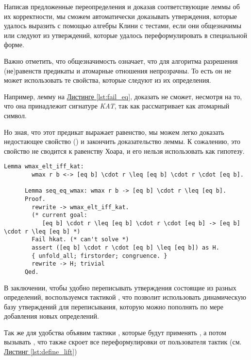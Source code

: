 \documentclass[times
              ,specification
              ,annotation
              ]{itmo-student-thesis}
\begin{document}
      Написав предложенные переопределения и доказав соответствующие леммы об их корректности, мы сможем
      автоматически доказывать утверждения, которые удалось выразить с помощью
      алгебры Клини с тестами, если они общезначимы или следуют из утверждений, которые удалось
      переформулировать в специальной форме.

      Важно отметить, что общезначимость означает, что для алгоритма разрешения (не)равенств предикаты
      и атомарные отношения непрозрачны. То есть он не может использовать те свойства, которые следуют
      из их определения.

      Например, лемму  на \hyperref[lst:fail_eq]{Листинге \ref{lst:fail_eq}},
       доказать не сможет, несмотря на то, что она принадлежит сигнатуре \textit{KAT}, так
      как рассматривает  как атомарный символ.

      Но зная, что этот предикат  выражает равенство, мы можем легко доказать
      недостающее свойство ()
      и закончить доказательство леммы. К сожалению, это свойство не сводится к равенству Хоара, и его нельзя использовать как гипотезу.
      \begin{lstlisting}[float=!h, gobble=6,
        caption={Пример невозможного использования hkat из-за нехватки гипотезы о внутреннем устройстве
        предиката}, label={lst:fail_eq}]
      Lemma wmax_elt_iff_kat:
        wmax r b <-> [eq b] \cdot r \leq [eq b] \cdot r \cdot [eq b].

      Lemma seq_eq_wmax: wmax r b -> [eq b] \cdot r \leq [eq b].
      Proof.
        rewrite -> wmax_elt_iff_kat.
        (* current goal:
           [eq b] \cdot r \leq [eq b] \cdot r \cdot [eq b] -> [eq b] \cdot r \leq [eq b] *)
        Fail hkat. (* can't solve *)
        assert ([eq b] \cdot r \cdot [eq b] \leq [eq b]) as H.
        { unfold_all; firstorder; congruence. }
        rewrite -> H; trivial
      Qed.
      \end{lstlisting}

      В заключении, чтобы удобно переписывать утверждения состоящие из разных определений, воспользуемся
      тактикой  \cite{coq_man}, что позволит использовать динамическую базу
      утверждений для переписывания, которую можно пополнять по мере добавления новых определений.
    
      Так же для удобства объявим тактики , которые будут применять ,
      а потом вызывать , что также скроет все переформулировки от
      пользователя тактик (см. \hyperref[lst:define_lift]{Листинг \ref{lst:define_lift}})
\end{document}
